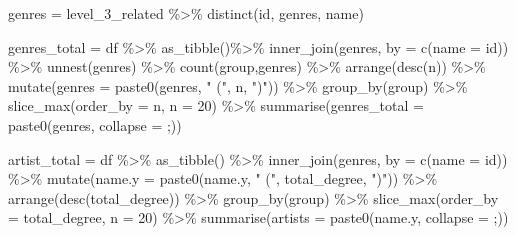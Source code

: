 \documentclass[
]{book}
\newenvironment{Shaded}{\begin{snugshade}}{\end{snugshade}}
\newcommand{\AttributeTok}[1]{\textcolor[rgb]{0.77,0.63,0.00}{#1}}
\newcommand{\DecValTok}[1]{\textcolor[rgb]{0.00,0.00,0.81}{#1}}
\newcommand{\FunctionTok}[1]{\textcolor[rgb]{0.00,0.00,0.00}{#1}}
\newcommand{\NormalTok}[1]{#1}
\newcommand{\OtherTok}[1]{\textcolor[rgb]{0.56,0.35,0.01}{#1}}
\newcommand{\SpecialCharTok}[1]{\textcolor[rgb]{0.00,0.00,0.00}{#1}}
\newcommand{\StringTok}[1]{\textcolor[rgb]{0.31,0.60,0.02}{#1}}
\begin{document}
\begin{Shaded}
\begin{Highlighting}[]
\NormalTok{genres }\OtherTok{=}\NormalTok{ level\_3\_related }\SpecialCharTok{\%\textgreater{}\%} \FunctionTok{distinct}\NormalTok{(id, genres, name)}



\NormalTok{  genres\_total  }\OtherTok{=}\NormalTok{ df }\SpecialCharTok{\%\textgreater{}\%} \FunctionTok{as\_tibble}\NormalTok{()}\SpecialCharTok{\%\textgreater{}\%} 
  \FunctionTok{inner\_join}\NormalTok{(genres, }\AttributeTok{by =} \FunctionTok{c}\NormalTok{(}\StringTok{\textquotesingle{}name\textquotesingle{}} \OtherTok{=} \StringTok{\textquotesingle{}id\textquotesingle{}}\NormalTok{)) }\SpecialCharTok{\%\textgreater{}\%} 
  \FunctionTok{unnest}\NormalTok{(genres) }\SpecialCharTok{\%\textgreater{}\%} 
  \FunctionTok{count}\NormalTok{(group,genres) }\SpecialCharTok{\%\textgreater{}\%} 
    \FunctionTok{arrange}\NormalTok{(}\FunctionTok{desc}\NormalTok{(n)) }\SpecialCharTok{\%\textgreater{}\%} 
    \FunctionTok{mutate}\NormalTok{(}\AttributeTok{genres =} \FunctionTok{paste0}\NormalTok{(genres, }\StringTok{" ("}\NormalTok{, n, }\StringTok{")"}\NormalTok{)) }\SpecialCharTok{\%\textgreater{}\%} 
  \FunctionTok{group\_by}\NormalTok{(group) }\SpecialCharTok{\%\textgreater{}\%} 
    \FunctionTok{slice\_max}\NormalTok{(}\AttributeTok{order\_by =}\NormalTok{ n, }\AttributeTok{n =} \DecValTok{20}\NormalTok{) }\SpecialCharTok{\%\textgreater{}\%} 
    \FunctionTok{summarise}\NormalTok{(}\AttributeTok{genres\_total =} \FunctionTok{paste0}\NormalTok{(genres, }\AttributeTok{collapse =} \StringTok{\textquotesingle{} ;\textquotesingle{}}\NormalTok{))}

\NormalTok{artist\_total }\OtherTok{=}\NormalTok{ df }\SpecialCharTok{\%\textgreater{}\%} \FunctionTok{as\_tibble}\NormalTok{() }\SpecialCharTok{\%\textgreater{}\%} 
  \FunctionTok{inner\_join}\NormalTok{(genres, }\AttributeTok{by =} \FunctionTok{c}\NormalTok{(}\StringTok{\textquotesingle{}name\textquotesingle{}} \OtherTok{=} \StringTok{\textquotesingle{}id\textquotesingle{}}\NormalTok{)) }\SpecialCharTok{\%\textgreater{}\%} 
  \FunctionTok{mutate}\NormalTok{(}\AttributeTok{name.y =} \FunctionTok{paste0}\NormalTok{(name.y, }\StringTok{" ("}\NormalTok{, total\_degree, }\StringTok{")"}\NormalTok{)) }\SpecialCharTok{\%\textgreater{}\%} 
  \FunctionTok{arrange}\NormalTok{(}\FunctionTok{desc}\NormalTok{(total\_degree)) }\SpecialCharTok{\%\textgreater{}\%} 
  \FunctionTok{group\_by}\NormalTok{(group) }\SpecialCharTok{\%\textgreater{}\%} \FunctionTok{slice\_max}\NormalTok{(}\AttributeTok{order\_by =}\NormalTok{ total\_degree, }\AttributeTok{n =} \DecValTok{20}\NormalTok{) }\SpecialCharTok{\%\textgreater{}\%} 
  \FunctionTok{summarise}\NormalTok{(}\AttributeTok{artists =} \FunctionTok{paste0}\NormalTok{(name.y, }\AttributeTok{collapse =} \StringTok{\textquotesingle{} ;\textquotesingle{}}\NormalTok{))}


\end{Highlighting}
\end{Shaded}
\end{document}
